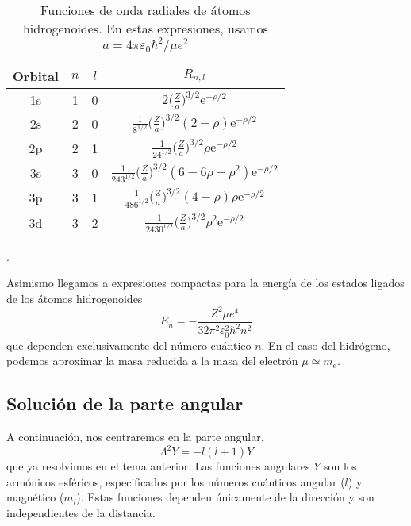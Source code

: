 \begin{table}[b!]
    \centering
    \begin{tabular}{|c|c|c|c|}
    \hline
         Orbital & $n$  & $l$ &$R_{n,l}$ \\
    \hline
    \hline
         1s & 1 & 0 & 
         $2\bigg(\frac{Z}{a}\bigg)^{3/2}\mathrm{e}^{-\rho/2}$ \\
         2s & 2 & 0 & 
         $\frac{1}{8^{1/2}}\bigg(\frac{Z}{a}\bigg)^{3/2}(2-\rho) \mathrm{e}^{-\rho/2}$\\
         2p & 2 & 1 & 
         $\frac{1}{24^{1/2}}\bigg(\frac{Z}{a}\bigg)^{3/2}\rho \mathrm{e}^{-\rho/2}$\\
         3s & 3 & 0 & 
         $\frac{1}{243^{1/2}}\bigg(\frac{Z}{a})^{3/2}(6-6\rho+\rho^2)\mathrm{e}^{-\rho/2}$ \\
         3p & 3 & 1 &
         $\frac{1}{486^{1/2}}\bigg(\frac{Z}{a}\bigg)^{3/2}(4-\rho)\rho \mathrm{e}^{-\rho/2}$ \\
         3d & 3 & 2 & $\frac{1}{2430^{1/2}}\bigg(\frac{Z}{a}\bigg)^{3/2}\rho^2\mathrm{e}^{-\rho/2}$ \\
    \hline
    \end{tabular}
    \caption{Funciones de onda radiales de átomos hidrogenoides. En estas expresiones, 
    usamos $a=4 \pi \varepsilon_0\hbar^2/\mu e^2$}. %
    \label{tb:radial_hydrogenoid}
\end{table}

Asimismo llegamos a expresiones compactas para la energía de 
los estados ligados de los átomos hidrogenoides
\begin{equation}
    E_n=-\frac{Z^2\mu e^4}{32\pi^2\varepsilon_0^2\hbar^2 n^2}
    \label{eq:Eh}
\end{equation}
que dependen exclusivamente del número cuántico $n$. 
En el caso del hidrógeno, podemos aproximar la masa reducida
a la masa del electrón $\mu\simeq m_e$. 

\subsection{Solución de la parte angular}
A continuación, nos centraremos en la parte angular, 
\begin{equation}
    \Lambda^2Y=-l(l+1)Y
\end{equation}
que ya resolvimos en el tema anterior. Las funciones angulares $Y$ 
son los armónicos esféricos, especificados por los números cuánticos
angular ($l$) y magnético ($m_l$). Estas funciones dependen únicamente
de la dirección y son independientes de la distancia. 

